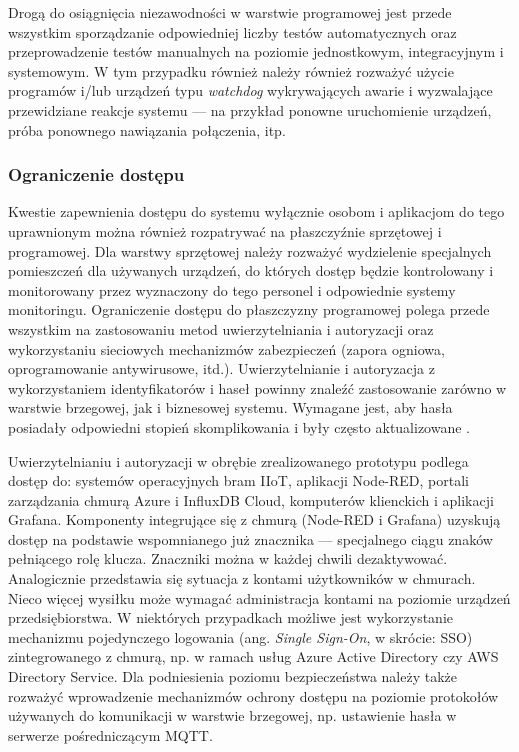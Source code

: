 \documentclass[a4paper, 12pt, twoside]{article}
\begin{document}
Drogą do osiągnięcia niezawodności w warstwie programowej jest przede wszystkim sporządzanie
odpowiedniej liczby testów automatycznych oraz przeprowadzenie testów manualnych
na poziomie jednostkowym, integracyjnym i systemowym.
W tym przypadku również należy również rozważyć użycie programów i/lub urządzeń typu \emph{watchdog}
wykrywających awarie i wyzwalające przewidziane reakcje systemu --- 
na przykład ponowne uruchomienie urządzeń, próba ponownego nawiązania połączenia, itp.

\subsubsection{Ograniczenie dostępu}

Kwestie zapewnienia dostępu do systemu wyłącznie osobom i aplikacjom do tego
uprawnionym można również rozpatrywać na płaszczyźnie sprzętowej i programowej.
Dla warstwy sprzętowej należy rozważyć wydzielenie specjalnych pomieszczeń
dla używanych urządzeń, do których dostęp będzie kontrolowany i monitorowany
przez wyznaczony do tego personel i odpowiednie systemy monitoringu.
Ograniczenie dostępu do płaszczyzny programowej polega przede wszystkim na zastosowaniu
metod uwierzytelniania i autoryzacji oraz wykorzystaniu sieciowych mechanizmów zabezpieczeń
(zapora ogniowa, oprogramowanie antywirusowe, itd.). Uwierzytelnianie i autoryzacja z wykorzystaniem
identyfikatorów i haseł powinny znaleźć zastosowanie zarówno w warstwie brzegowej,
jak i biznesowej systemu. Wymagane jest, aby hasła posiadały odpowiedni stopień skomplikowania
i były często aktualizowane \cite{situation-aware-iot-gateway}.

Uwierzytelnianiu i autoryzacji w obrębie zrealizowanego prototypu podlega dostęp do: systemów operacyjnych
bram IIoT, aplikacji Node-RED, portali zarządzania chmurą Azure i InfluxDB Cloud,
komputerów klienckich i aplikacji Grafana. Komponenty integrujące się z chmurą
(Node-RED i Grafana) uzyskują dostęp na podstawie wspomnianego już znacznika ---
specjalnego ciągu znaków pełniącego rolę klucza. Znaczniki można w każdej
chwili dezaktywować. Analogicznie przedstawia się
sytuacja z kontami użytkowników w chmurach. Nieco więcej wysiłku może wymagać
administracja kontami na poziomie urządzeń przedsiębiorstwa. W niektórych
przypadkach możliwe jest wykorzystanie mechanizmu pojedynczego logowania
(ang. \emph{Single Sign-On}, w skrócie: SSO) zintegrowanego z chmurą, np.
w ramach usług Azure Active Directory czy AWS Directory Service.
Dla podniesienia poziomu bezpieczeństwa należy także rozważyć wprowadzenie
mechanizmów ochrony dostępu na poziomie protokołów używanych do komunikacji
w warstwie brzegowej, np. ustawienie hasła w serwerze pośredniczącym MQTT.
\end{document}

